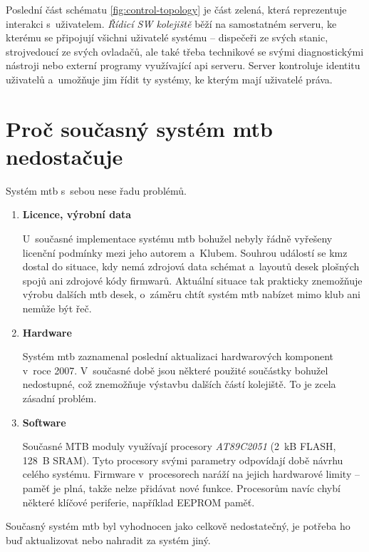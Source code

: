 Poslední část schématu \ref{fig:control-topology} je část zelená, která
reprezentuje interakci s~uživatelem. \textit{Řídicí SW kolejiště} běží na
samostatném serveru, ke kterému se připojují všichni uživatelé systému –
dispečeři ze svých stanic, strojvedoucí ze svých ovladačů, ale také třeba
technikové se svými diagnostickými nástroji nebo externí programy využívající
\gls{api} serveru. Server kontroluje identitu uživatelů a~umožňuje jim řídit ty
systémy, ke kterým mají uživatelé práva.

\section{Proč současný systém \gls{mtb} nedostačuje} \label{sec:mtb_fail}

Systém \gls{mtb} s~sebou nese řadu problémů.

\begin{enumerate}
\item \textbf{Licence, výrobní data}

U~současné implementace systému \gls{mtb} bohužel nebyly řádně vyřešeny licenční
podmínky mezi jeho autorem a~Klubem. Souhrou událostí se \gls{kmz} dostal do
situace, kdy nemá zdrojová data schémat a~layoutů desek plošných spojů ani
zdrojové kódy firmwarů.
Aktuální situace tak prakticky znemožňuje výrobu dalších \gls{mtb} desek,
o~záměru chtít systém \gls{mtb} nabízet mimo klub ani nemůže být řeč.

\item \textbf{Hardware}

Systém \gls{mtb} zaznamenal poslední aktualizaci hardwarových komponent v~roce
2007. V~současné době jsou některé použité součástky bohužel nedostupné, což
znemožňuje výstavbu dalších částí kolejiště. To je zcela zásadní problém.

\item \textbf{Software}

Současné MTB moduly využívají procesory \textit{AT89C2051} (2~kB FLASH,
128~B SRAM). Tyto procesory svými parametry odpovídají době návrhu celého
systému. Firmware v~procesorech naráží na jejich hardwarové limity – paměť
je plná, takže nelze přidávat nové funkce. Procesorům navíc chybí některé
klíčové periferie, například EEPROM paměť.

\end{enumerate}

Současný systém \gls{mtb} byl vyhodnocen jako celkově nedostatečný, je potřeba
ho buď aktualizovat nebo nahradit za systém jiný.

